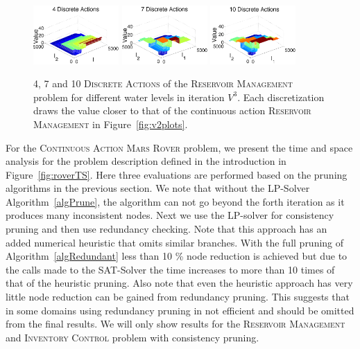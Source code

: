 \documentclass[twoside,11pt]{article}
\newcommand{\MarsRover}{\textsc{Mars Rover }}
\newcommand{\InventoryControl}{\textsc{Inventory Control }}
\newcommand{\WaterReservoir}{\textsc{Reservoir Management }}
\begin{document}
\begin{figure}[tbp!]
\vspace{-2mm}
\centering
\includegraphics[width=0.29\textwidth]{Figures2/camdp/res3d4.pdf}
\includegraphics[width=0.29\textwidth]{Figures2/camdp/res3d7.pdf}
\includegraphics[width=0.29\textwidth]{Figures2/camdp/res3d10.pdf}
\vspace{-3mm}
\caption{%
4, 7 and 10 \textsc{Discrete Actions} of the \WaterReservoir problem for different water levels in iteration $V^3$. Each discretization draws the value closer to that of the continuous action \WaterReservoir in Figure~\ref{fig:v2plots}.  
}
\label{fig:discreteplots}
\vspace{-4mm}
\end{figure}
For the \textsc{Continuous Action} \MarsRover problem, we present the time and space analysis for the problem description defined in the introduction in Figure~\ref{fig:roverTS}. Here three evaluations are performed based on the pruning algorithms in the previous section. We note that without the LP-Solver Algorithm~\ref{algPrune}, the algorithm can not go beyond the forth iteration as it produces many inconsistent nodes. Next we use the LP-solver for consistency pruning and then use redundancy checking. Note that this approach has an added numerical heuristic that omits similar branches. With the full pruning of Algorithm~\ref{algRedundant} less than 10 \% node reduction is achieved but due to the calls made to the SAT-Solver the time increases to more than 10 times of that of the heuristic pruning.  Also note that even the heuristic approach has very little node reduction can be gained from redundancy pruning. This suggests that in some domains using redundancy pruning in not efficient and should be omitted from the final results. 
We will only show results for the  \WaterReservoir and \InventoryControl problem with consistency pruning. 
\end{document}
